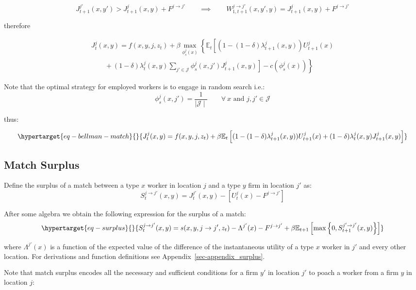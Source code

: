 \documentclass[
  letterpaper,
  DIV=11,
  numbers=noendperiod]{scrreprt}
\begin{document}
\[J^{j'}_{t+1}(x,y')>J^{j}_{t+1}(x,y)+F^{j\to j'}  \qquad \implies \qquad W^{j\to j'}_{1,t+1}(x,y',y) = J^{j}_{t+1}(x,y)+F^{j\to j'}\]

therefore

\begin{align*}
    J^j_{t}(x,y)=f(x,y,j,z_t)+\beta\max_{\phi^j_s(x)}\left\{\mathbb{E}_t\left[(1 - (1-\delta)\lambda^j_{t+1}(x,y))U^j_{t+1}(x) \right.\right. \\ \left.\left. \qquad + (1-\delta) \lambda^j_t(x,y)\sum_{j'\in\mathcal{J}}\phi_s^j(x,j')J^j_{t+1}(x,y)\right] - c(\phi^j_s(x))\right\}
\end{align*}

Note that the optimal strategy for employed workers is to engage in
random search i.e.:
\[\phi_{s}^{j}(x, j') = \frac{1}{\mid\mathcal{J}\mid} \qquad \forall\:x \text{ and }j,j'\in\mathcal{J}\]

thus:

\begin{equation}\protect\hypertarget{eq-bellman-match}{}{J^j_{t}(x,y)=f(x,y,j,z_t)+\beta\mathbb{E}_t\left[(1 - (1-\delta)\lambda^j_{t+1}(x,y))U^j_{t+1}(x) + (1-\delta) \lambda^j_t(x,y)J^j_{t+1}(x,y)\right]}\label{eq-bellman-match}\end{equation}

\hypertarget{match-surplus}{%
\subsection{Match Surplus}\label{match-surplus}}

Define the surplus of a match between a type \(x\) worker in location
\(j\) and a type \(y\) firm in location \(j'\) as:
\[S^{j\to j'}_{t}(x,y) = J^{j'}_{t}(x,y) - [U^{j}_t(x) - F^{j\to j'}]\]

After some algebra we obtain the following expression for the surplus of
a match:
\begin{equation}\protect\hypertarget{eq-surplus}{}{S_{t}^{j\to j'}(x,y) = s(x,y,j \to j',z_t) - \Lambda^{j'}(x) - F^{j \to j'} + \beta\mathbb{E}_{t+1}\left[\max\left\{0, S^{j'\to j'}_{t+1}(x,y)\right\}\right]}\label{eq-surplus}\end{equation}

where \(\Lambda^{j'}(x)\) is a function of the expected value of the
difference of the instantaneous utility of a type \(x\) worker in \(j'\)
and every other location. For derivations and function definitions see
Appendix~\ref{sec-appendix_surplus}.

Note that match surplus encodes all the necessary and sufficient
conditions for a firm \(y'\) in location \(j'\) to poach a worker from a
firm \(y\) in location \(j\):
\end{document}

